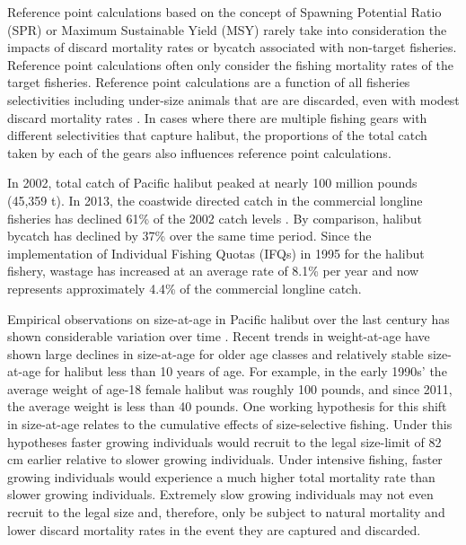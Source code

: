 \documentclass[12pt,leqno]{article}
\begin{document}
Reference point calculations based on the concept of Spawning Potential Ratio (SPR) or Maximum Sustainable Yield (MSY) rarely take into consideration the impacts of discard mortality rates or bycatch associated with non-target fisheries.  Reference point calculations often only consider the fishing mortality rates of the target fisheries. Reference point calculations are a function of all fisheries selectivities including under-size animals that are are discarded, even with modest discard mortality rates \citep{goodyear1993spawning,coggins2007ecm}.  In cases where there are multiple fishing gears with different selectivities that capture halibut, the proportions of the total catch taken by each of the gears also influences reference point calculations.

In 2002, total catch of Pacific halibut peaked at nearly 100 million pounds (45,359 t). In 2013, the coastwide directed catch in the commercial longline fisheries has declined  61\% of the 2002 catch levels \citep{stewartMartell2014}.  By comparison, halibut bycatch has declined by 37\% over the same time period.  Since the implementation of Individual Fishing Quotas (IFQs) in 1995 for the halibut fishery, wastage has increased at an average rate of 8.1\% per year and now represents approximately 4.4\% of the commercial longline catch.

Empirical observations on size-at-age in Pacific halibut over the last century has shown considerable variation over time \citep{Stewart2014}.  Recent trends in weight-at-age have shown large declines in size-at-age for older age classes and relatively stable size-at-age for halibut less than 10 years of age.  For example, in the early 1990s' the average weight of age-18 female halibut was roughly 100 pounds, and since 2011, the average weight is less than 40 pounds.  One working hypothesis for this shift in size-at-age relates to the cumulative effects of size-selective fishing.  Under this hypotheses faster growing individuals would recruit to the legal size-limit of 82 cm earlier relative to slower growing individuals.  Under intensive fishing, faster growing individuals would experience a much higher total mortality rate than slower growing individuals.  Extremely slow growing individuals may not even recruit to the legal size and, therefore, only be subject to natural mortality and lower discard mortality rates in the event they are captured and discarded.
\end{document}
